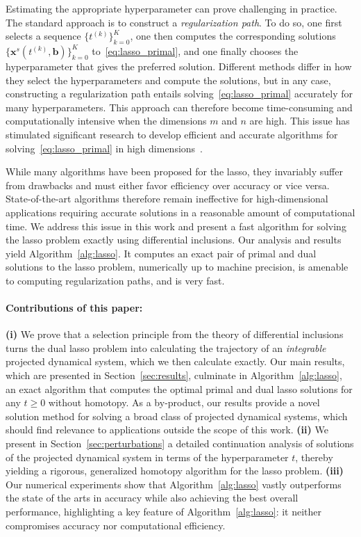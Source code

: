 \documentclass[11pt]{article}
\numberwithin{prop}{section}
\numberwithin{lem}{section}
\numberwithin{rem}{section}
\numberwithin{cor}{section}
\numberwithin{thm}{section}
\numberwithin{defn}{section}
\numberwithin{fact}{section}
\theoremstyle{plain}
\def\bb {\boldsymbol{b}}
\def\bx {\boldsymbol{x}}
\begin{document}
Estimating the appropriate hyperparameter can prove challenging in practice. The standard approach is to construct a \emph{regularization path}. To do so, one first selects a sequence $\{t^{(k)}\}_{k=0}^{K}$, one then computes the corresponding solutions $\{\bx^{s}(t^{(k)},\bb)\}_{k=0}^{K}$ to~\eqref{eq:lasso_primal}, and one finally chooses the hyperparameter that gives the preferred solution. Different methods differ in how they select the hyperparameters and compute the solutions, but in any case, constructing a regularization path entails solving~\eqref{eq:lasso_primal} accurately for many hyperparameters. This approach can therefore become time-consuming and computationally intensive when the dimensions $m$ and $n$ are high. This issue has stimulated significant research to develop efficient and accurate algorithms for solving~\eqref{eq:lasso_primal} in high dimensions~\cite{osborne2000new,osborne2000lasso,efron2004least,daubechies2004iterative,friedman2007pathwise,donoho2008fast,beck2009fast,bringmann2018homotopy}.


While many algorithms have been proposed for the lasso, they invariably suffer from drawbacks and must either favor efficiency over accuracy or vice versa. State-of-the-art algorithms therefore remain ineffective for high-dimensional applications requiring accurate solutions in a reasonable amount of computational time. We address this issue in this work and present a fast algorithm for solving the lasso problem exactly using differential inclusions. Our analysis and results yield Algorithm~\ref{alg:lasso}. It computes an exact pair of primal and dual solutions to the lasso problem, numerically up to machine precision, is amenable to computing regularization paths, and is very fast.


\paragraph{Contributions of this paper:} \textbf{(i)} We prove that a selection principle from the theory of differential inclusions turns the dual lasso problem into calculating the trajectory of an \emph{integrable} projected dynamical system, which we then calculate exactly. Our main results, which are presented in Section~\ref{sec:results}, culminate in Algorithm~\ref{alg:lasso}, an exact algorithm that computes the optimal primal and dual lasso solutions for any $t\geqslant0$ without homotopy. As a by-product, our results provide a novel solution method for solving a broad class of projected dynamical systems, which should find relevance to applications outside the scope of this work. \textbf{(ii)} We present in Section~\ref{sec:perturbations} a detailed continuation analysis of solutions of the projected dynamical system in terms of the hyperparameter $t$, thereby yielding a rigorous, generalized homotopy algorithm for the lasso problem. \textbf{(iii)} Our numerical experiments show that Algorithm~\ref{alg:lasso} vastly outperforms the state of the arts in accuracy while also achieving the best overall performance, highlighting a key feature of Algorithm~\ref{alg:lasso}: it neither compromises accuracy nor computational efficiency.
\end{document}
